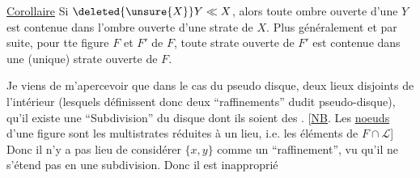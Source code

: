 \uline{Corollaire} Si $\deleted{\unsure{X}}Y\ll X$, alors  toute ombre ouverte d'une   $Y$ est contenue dans l'ombre ouverte d'une strate de $X$. Plus généralement et par suite, pour tte figure $F$ et    $F'$ de $F$, toute   strate ouverte de $F'$ est contenue dans une (unique) strate ouverte de $F$.

\enspace{}

Je viens de m'apercevoir que dans le cas du pseudo disque,  deux lieux disjoints   de l'intérieur (lesquels définissent donc deux ``raffinements'' dudit pseudo-disque), qu'il existe une ``Subdivision'' du disque dont ils soient des . [\uline{NB}. Les \uline{noeuds} d'une figure  sont les multistrates  réduites à un lieu, i.e. les éléments de $F\cap\mathcal L$] Donc  il n'y a pas lieu de considérer $\{x,y\}$ comme un ``raffinement'', vu qu'il ne s'étend pas en une subdivision. Donc il est inapproprié
